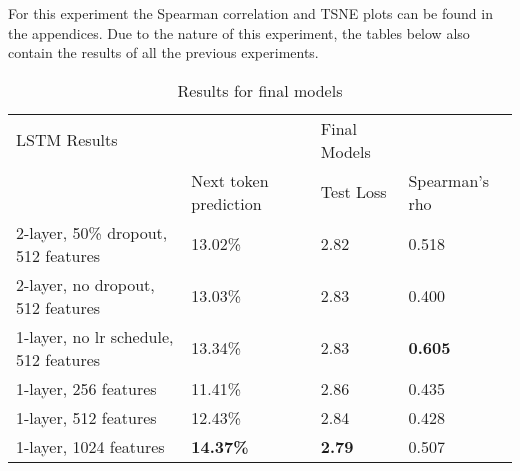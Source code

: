 For this experiment the Spearman correlation and TSNE plots can be found in the appendices. Due to the nature of this experiment, the tables below also contain the results of all the previous experiments.
\begin{table}[!ht]
  \centering
\begin{tabular}{|l|lll|}
\hline
LSTM Results                          &                                                     & Final Models                       &                \\ \cline{2-4}
                                      & \multicolumn{1}{l|}{Next token prediction}          & \multicolumn{1}{l|}{Test Loss}     & Spearman's rho \\ \hline
2-layer, 50\% dropout, 512 features   & \multicolumn{1}{l|}{13.02\%}                        & \multicolumn{1}{l|}{2.82}          & 0.518          \\ \hline
2-layer, no dropout, 512 features     & \multicolumn{1}{l|}{13.03\%}                        & \multicolumn{1}{l|}{2.83}          & 0.400          \\ \hline
1-layer, no lr schedule, 512 features & \multicolumn{1}{l|}{13.34\%}                        & \multicolumn{1}{l|}{2.83}          & \textbf{0.605} \\ \hline
1-layer, 256 features                 & \multicolumn{1}{l|}{11.41\%}                        & \multicolumn{1}{l|}{2.86}          & 0.435          \\ \hline
1-layer, 512 features                 & \multicolumn{1}{l|}{12.43\%}                        & \multicolumn{1}{l|}{2.84}          & 0.428          \\ \hline
1-layer, 1024 features                & \multicolumn{1}{l|}{\textbf{14.37\%}}               & \multicolumn{1}{l|}{\textbf{2.79}} & 0.507          \\ \hline
\end{tabular}
\caption{Results for final models}
\label{tab:final}
\end{table}
